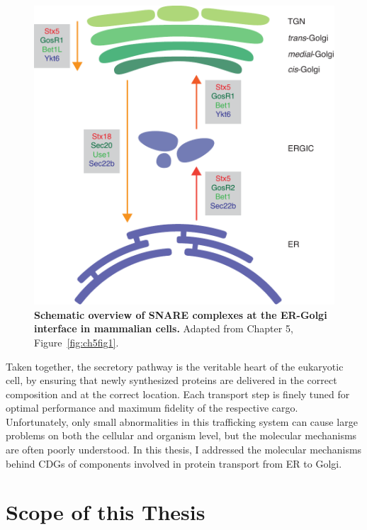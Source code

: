 \begin{figure}
    \includegraphics[keepaspectratio=true,width=\textwidth,height=\textheight]{chapters/chapter1/chapter1_Figure4.pdf}
    \caption{\textbf{Schematic overview of SNARE complexes at the ER-Golgi interface in mammalian cells.} Adapted from Chapter 5, Figure~\ref{fig:ch5fig1}.}
    \label{fig:ch1fig4}
\end{figure}

Taken together, the secretory pathway is the veritable heart of the eukaryotic cell, by ensuring that newly synthesized proteins are delivered in the correct composition and at the correct location. Each transport step is finely tuned for optimal performance and maximum fidelity of the respective cargo. Unfortunately, only small abnormalities in this trafficking system can cause large problems on both the cellular and organism level, but the molecular mechanisms are often poorly understood. In this thesis, I addressed the molecular mechanisms behind CDGs of components involved in protein transport from ER to Golgi.

\clearpage

\section{Scope of this Thesis}

